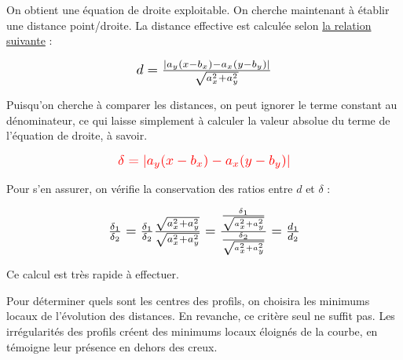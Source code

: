 \documentclass[12pt]{article}
\begin{document}
    On obtient une équation de droite exploitable. On cherche maintenant à établir une distance point/droite. La distance effective est calculée selon \href{https://fr.wikipedia.org/wiki/Distance_d%27un_point_%C3%A0_une_droite#Dans_le_plan}{la relation suivante} :

    \begin{spacing}{1}
        \begin{equation}
            \scalebox{1.25}{$d = \frac{|a_y(x - b_x) - a_x(y - b_y)|}{\sqrt{a_x^2 + a_y^2}}$}
        \end{equation}
    \end{spacing}

    Puisqu'on cherche à comparer les distances, on peut ignorer le terme constant au dénominateur, ce qui laisse simplement à calculer la valeur absolue du terme de l'équation de droite, à savoir.

    \begin{spacing}{1}
        \begin{equation}
            \scalebox{1.25}{$\textcolor{red}{\delta = |a_y(x - b_x) - a_x(y - b_y)|}$}
        \end{equation}
    \end{spacing}

    Pour s'en assurer, on vérifie la conservation des ratios entre $d$ et $\delta$ :

    \begin{spacing}{1}
        \begin{equation}
            \scalebox{1.25}{$\frac{\delta_1}{\delta_2} = \frac{\delta_1}{\delta_2}\frac{\sqrt{a_x^2 + a_y^2}}{\sqrt{a_x^2 + a_y^2}} = \frac{\frac{\delta_1}{\sqrt{a_x^2 + a_y^2}}}{\frac{\delta_2}{\sqrt{a_x^2 + a_y^2}}} = \frac{d_1}{d_2}$}
        \end{equation}
    \end{spacing}

    Ce calcul est très rapide à effectuer.
    
    Pour déterminer quels sont les centres des profils, on choisira les minimums locaux de l'évolution des distances. En revanche, ce critère seul ne suffit pas. Les irrégularités des profils créent des minimums locaux éloignés de la courbe, en témoigne leur présence en dehors des creux.
    
\end{document}
